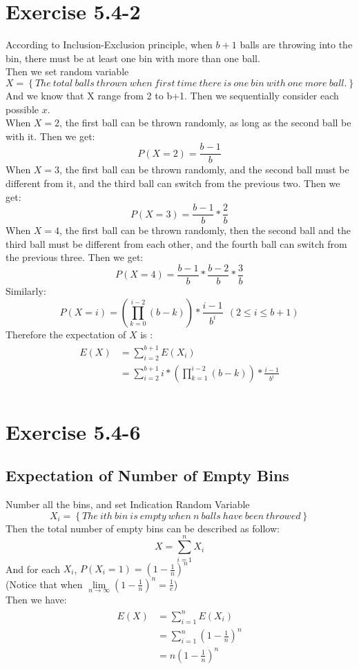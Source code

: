 \documentclass[oneside]{homework} %
\begin{document}
\maketitle
\newpage
\section {Exercise 5.4-2}
According to Inclusion-Exclusion principle, when $b+1$ balls are throwing into the bin, there must be at least one bin with more than one ball.
\\Then we set random variable $$X = \left\{ The~total~balls~thrown~when~first~time~there~is~one~bin~with~one~more~ball. \right\}$$ And we know that X range from 2 to b+1.
Then we sequentially consider each possible $x$.
\\  When $X=2$, the first ball can be thrown randomly, as long as the second ball be with it. Then we get:
$$P(X=2) = \frac{b-1}{b}$$
When $X=3$, the first ball can be thrown randomly, and the second ball must be different from it, and the third ball can switch from the previous two. Then we get: 
$$P(X=3) = \frac{b-1}{b}*\frac{2}{b}$$
When $X=4$, the first ball can be thrown randomly, then the second ball and the third ball must be different from each other, and the fourth ball can switch from the previous three. Then we get: 
$$P(X=4) = \frac{b-1}{b}*\frac{b-2}{b}*\frac{3}{b}$$
Similarly:
$$P(X=i) = ( \prod_{k=0}^{i-2}\left( b-k \right) ) *\frac{i-1}{b^{i}} ~ ~ (2\leq i \leq b+1)$$
Therefore the expectation of $X$ is : 
\begin{eqnarray}
  \begin{split}
	E(X) &= \sum_{i=2}^{b+1}E(X_{i}) \\
	 &= \sum_{i=2}^{b+1} i * (\prod_{k=1}^{i-2}\left( b-k \right)) *\frac{i-1}{b^{i}}\\
  \end{split}
\end{eqnarray}

\section {Exercise 5.4-6}
\subsection {Expectation of Number of Empty Bins}
Number all the bins, and set Indication Random Variable 
$$X_{i} = \left\{The~ith~bin~is~empty~when~n~balls~have~been~throwed \right\}$$
Then the total number of empty bins can be described as follow:
$$ X = \sum_{i=1}^{n}X_{i}$$
And for each $X_{i}$, $P(X_{i}=1) = (1-\frac{1}{n})^{n}$ \\
(Notice that when $\lim\limits_{n\to\infty}(1-\frac{1}{n})^{n} = \frac{1}{e}$)
\\ Then we have:
\begin{eqnarray}
  \begin{split}
	E(X) &= \sum_{i=1}^{n}E(X_{i}) \\
	 &= \sum_{i=1}^{n}(1-\frac{1}{n})^{n} \\
	 &= n(1-\frac{1}{n})^{n} \\
  \end{split}
\end{eqnarray}
\end{document}
